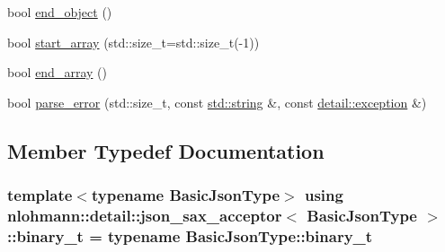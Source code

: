 \begin{DoxyCompactItemize}
bool \hyperlink{classnlohmann_1_1detail_1_1json__sax__acceptor_a919645fd1827a561a994d70a435e3f19}{end\+\_\+object} ()
\item 
bool \hyperlink{classnlohmann_1_1detail_1_1json__sax__acceptor_a8238e8090cbb4ed8a22cbc97bfb833a5}{start\+\_\+array} (std\+::size\+\_\+t=std\+::size\+\_\+t(-\/1))
\item 
bool \hyperlink{classnlohmann_1_1detail_1_1json__sax__acceptor_a22ef94ca5476a9563dcaca15b7d6e654}{end\+\_\+array} ()
\item 
bool \hyperlink{classnlohmann_1_1detail_1_1json__sax__acceptor_a95bb3e8b6feaa523ecda8106fb5e38e3}{parse\+\_\+error} (std\+::size\+\_\+t, const \hyperlink{namespacenlohmann_1_1detail_a1ed8fc6239da25abcaf681d30ace4985ab45cffe084dd3d20d928bee85e7b0f21}{std\+::string} \&, const \hyperlink{classnlohmann_1_1detail_1_1exception}{detail\+::exception} \&)
\end{DoxyCompactItemize}


\subsection{Member Typedef Documentation}
\subsubsection[{\texorpdfstring{binary\+\_\+t}{binary_t}}]{\setlength{\rightskip}{0pt plus 5cm}template$<$typename Basic\+Json\+Type$>$ using {\bf nlohmann\+::detail\+::json\+\_\+sax\+\_\+acceptor}$<$ Basic\+Json\+Type $>$\+::{\bf binary\+\_\+t} =  typename Basic\+Json\+Type\+::binary\+\_\+t}\hypertarget{classnlohmann_1_1detail_1_1json__sax__acceptor_a56346d95ee4e539eaded2e6826fecf66}{}\label{classnlohmann_1_1detail_1_1json__sax__acceptor_a56346d95ee4e539eaded2e6826fecf66}
